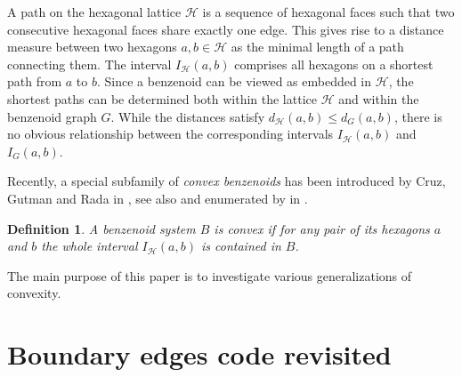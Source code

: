\documentclass[a4paper,10pt]{article}
\newcounter{theorem}
\newtheorem{definition}{Definition}[section]
\begin{document}
A path on the hexagonal lattice $\mathcal{H}$ is a sequence of hexagonal
faces such that two consecutive hexagonal faces share exactly one
edge. This gives rise to a distance measure between two hexagons
$a,b\in\mathcal{H}$ as the minimal length of a path connecting them. The
interval $I_\mathcal{H}(a,b)$ comprises all hexagons on a shortest path
from $a$ to $b$. Since a benzenoid can be viewed as embedded in
$\mathcal{H}$, the shortest paths can be determined both within the lattice
$\mathcal{H}$ and within the benzenoid graph $G$. While the distances
satisfy $d_{\mathcal{H}}(a,b)\le d_G(a,b)$, there is no obvious
relationship between the corresponding intervals $I_\mathcal{H}(a,b)$ and
$I_G(a,b)$.

Recently, a special subfamily of \emph{convex benzenoids} has been
introduced by Cruz, Gutman and Rada in \cite{CruGutRad12}, see also
\cite{Rada:04} and enumerated by in \cite{basic2017}.
\begin{definition}
\label{def:original}
A benzenoid system $B$ is \emph{convex} if for any pair of its hexagons $a$
and $b$ the whole interval $I_\mathcal{H}(a,b)$ is contained in $B$.
\end{definition}
The main purpose of this paper is to investigate various generalizations of
convexity.

\section{Boundary edges code revisited}
\end{document}
